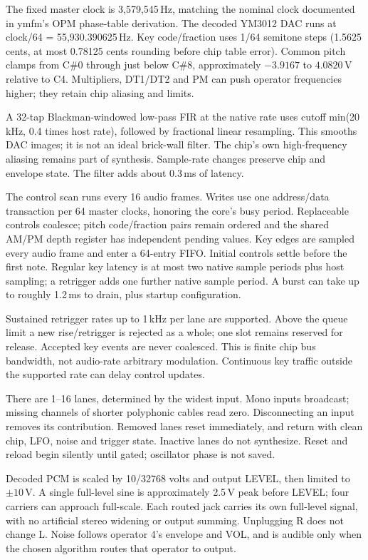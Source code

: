 The fixed master clock is 3,579,545\,Hz, matching the nominal clock documented
in ymfm's OPM phase-table derivation. The decoded YM3012 DAC runs at
clock/64 = 55,930.390625\,Hz. Key code/fraction uses 1/64 semitone steps
(1.5625 cents, at most 0.78125 cents rounding before chip table error).
Common pitch clamps from C\#0 through just below C\#8, approximately
$-3.9167$ to $4.0820$\,V relative to C4. Multipliers, DT1/DT2 and PM can
push operator frequencies higher; they retain chip aliasing and limits.

A 32-tap Blackman-windowed low-pass FIR at the native rate uses cutoff
min(20\,kHz, 0.4 times host rate), followed by fractional linear resampling.
This smooths DAC images; it is not an ideal brick-wall filter. The chip's own
high-frequency aliasing remains part of synthesis. Sample-rate changes preserve
chip and envelope state. The filter adds about 0.3\,ms of latency.

The control scan runs every 16 audio frames. Writes use one address/data
transaction per 64 master clocks, honoring the core's busy period. Replaceable
controls coalesce; pitch code/fraction pairs remain ordered and the shared
AM/PM depth register has independent pending values. Key edges are sampled
every audio frame and enter a 64-entry FIFO. Initial controls settle before
the first note. Regular key latency is at most two native sample periods
plus host sampling; a retrigger adds one further native sample period.
A burst can take up to roughly 1.2\,ms to drain, plus startup configuration.

Sustained retrigger rates up to 1\,kHz per lane are supported. Above the queue
limit a new rise/retrigger is rejected as a whole; one slot remains reserved
for release. Accepted key events are never coalesced. This is finite chip
bus bandwidth, not audio-rate arbitrary modulation. Continuous key traffic
outside the supported rate can delay control updates.

There are 1--16 lanes, determined by the widest input. Mono inputs broadcast;
missing channels of shorter polyphonic cables read zero. Disconnecting an
input removes its contribution. Removed lanes reset immediately, and return
with clean chip, LFO, noise and trigger state. Inactive lanes do not synthesize.
Reset and reload begin silently until gated; oscillator phase is not saved.

Decoded PCM is scaled by 10/32768 volts and output LEVEL, then limited to
$\pm10$\,V. A single full-level sine is approximately 2.5\,V peak before
LEVEL; four carriers can approach full-scale. Each routed jack carries its
own full-level signal, with no artificial stereo widening or output summing.
Unplugging R does not change L. Noise follows operator 4's envelope and VOL,
and is audible only when the chosen algorithm routes that operator to output.

